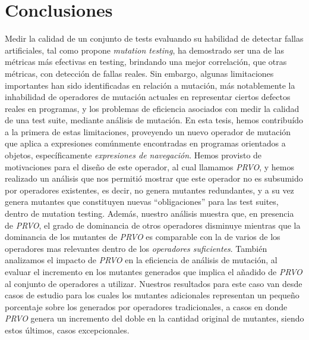 \chapter[Conclusiones]{Conclusiones}
\label{cap:conclutions}

Medir la calidad de un conjunto de tests evaluando su habilidad de detectar fallas artificiales, tal como propone \emph{mutation testing}, ha demostrado ser una de las m\'etricas m\'as efectivas en testing, brindando una mejor correlaci\'on, que otras m\'etricas, con detecci\'on de fallas reales. Sin embargo, algunas limitaciones importantes han sido identificadas en relaci\'on a mutaci\'on, m\'as notablemente la inhabilidad de operadores de mutaci\'on actuales en representar ciertos defectos reales en programas, y los problemas de eficiencia asociados con medir la calidad de una test suite, mediante an\'alisis de mutaci\'on. En esta tesis, hemos contribu\'ido a la primera de estas limitaciones, proveyendo un nuevo operador de mutaci\'on que aplica a expresiones com\'unmente encontradas en programas orientados a objetos, espec\'ificamente \emph{expresiones de navegaci\'on}. Hemos provisto de motivaciones para el dise\~no de este operador, al cual llamamos \emph{PRVO}, y hemos realizado un an\'alisis que nos permiti\'o mostrar que este operador no es subsumido por operadores existentes, es decir, no genera mutantes redundantes, y a su vez genera mutantes que constituyen nuevas ``obligaciones'' para las test suites, dentro de mutation testing. Adem\'as, nuestro an\'alisis muestra que, en presencia de \emph{PRVO}, el grado de dominancia de otros operadores disminuye mientras que la dominancia de los mutantes de \emph{PRVO} es comparable con la de varios de los operadores mas relevantes dentro de los \emph{operadores suficientes}. Tambi\'en analizamos el impacto de \emph{PRVO} en la eficiencia de an\'alisis de mutaci\'on, al evaluar el incremento en los mutantes generados que implica el a\~nadido de \emph{PRVO} al conjunto de operadores a utilizar. Nuestros resultados para este caso van desde casos de estudio para los cuales los mutantes adicionales representan un peque\~no porcentaje sobre los generados por operadores tradicionales, a casos en donde \emph{PRVO} genera un incremento del doble en la cantidad original de mutantes, siendo estos \'ultimos, casos excepcionales.

